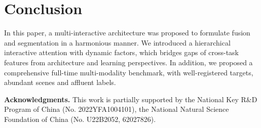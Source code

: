 \documentclass[10pt,twocolumn,letterpaper]{article}
\begin{document}
\section{Conclusion}
In this paper, a multi-interactive architecture was proposed to formulate fusion and segmentation in a harmonious manner. We introduced a hierarchical interactive attention with dynamic  factors, which bridges gaps of cross-task features from architecture and learning perspectives. In addition, we proposed a comprehensive full-time multi-modality benchmark, with well-registered targets, abundant scenes and affluent labels.

\noindent\textbf{Acknowledgments.} This work is partially supported by the National Key R\&D Program of China (No. 2022YFA1004101), the National Natural Science Foundation of China (No. U22B2052,  62027826).
{\small
	
	
}
\end{document}
